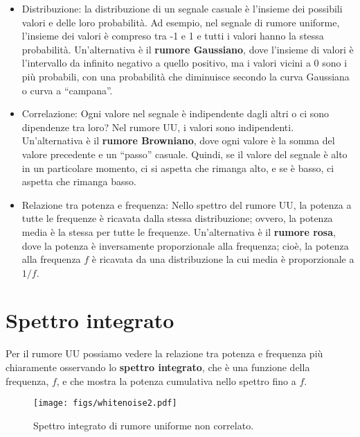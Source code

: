 \documentclass[12pt]{book} \usepackage[width=5.5in,height=8.5in, hmarginratio=3:2,vmarginratio=1:1]{geometry}
\begin{document}
\begin{itemize} 

\item Distribuzione: la distribuzione di un segnale casuale è l'insieme dei possibili valori e delle loro probabilità. Ad esempio, nel segnale di rumore uniforme, l'insieme dei valori è compreso tra -1 e 1 e tutti i valori hanno la stessa probabilità. Un'alternativa è il {\bf rumore Gaussiano}, dove l'insieme di valori è l'intervallo da infinito negativo a quello positivo, ma i valori vicini a 0 sono i più probabili, con una probabilità che diminuisce secondo la curva Gaussiana o curva a ``campana''.

\item Correlazione: Ogni valore nel segnale è indipendente dagli altri o ci sono dipendenze tra loro? Nel rumore UU, i valori sono indipendenti. Un'alternativa è il {\bf rumore Browniano}, dove ogni valore è la somma del valore precedente e un ``passo'' casuale. Quindi, se il valore del segnale è alto in un particolare momento, ci si aspetta che rimanga alto, e se è basso, ci aspetta che rimanga basso.

\item Relazione tra potenza e frequenza: Nello spettro del rumore UU, la potenza a tutte le frequenze è ricavata dalla stessa distribuzione; ovvero, la potenza media è la stessa per tutte le frequenze. Un'alternativa è il {\bf rumore rosa}, dove la potenza è inversamente proporzionale alla frequenza; cioè, la potenza alla frequenza $f$ è ricavata da una distribuzione la cui media è proporzionale a $1/f$.

\end{itemize} 

\section{Spettro integrato} 

Per il rumore UU possiamo vedere la relazione tra potenza e frequenza più chiaramente osservando lo {\bf spettro integrato}, che è una funzione della frequenza, $f$, e che mostra la potenza cumulativa nello spettro fino a $f$.

\begin{figure} 

\centerline{\texttt{[image: figs/whitenoise2.pdf]}} \caption{Spettro integrato di rumore uniforme non correlato.} \label{fig.whitenoise2} \end{figure} 
\end{document}

